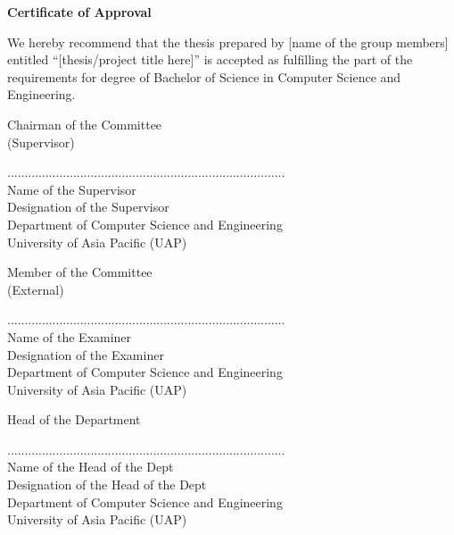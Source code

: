 \newpage
    \begin{center}
    
        \vspace*{0.1cm}
        \large
        
        
        \large
        \textbf{Certificate of Approval}\\
        \vspace{0.5cm}
        
    \end{center}
\noindent
{\large We hereby recommend that the thesis prepared by [name of the group members] entitled “[thesis/project title here]” is accepted as fulfilling the part of the requirements for degree of Bachelor of Science in Computer Science and Engineering.} 
\vspace{0.5cm}


\begin{flushright}
\vspace{1cm}
Chairman of the Committee
\\(Supervisor)
\end{flushright}
\vspace{-3cm}
................................................................................\\
Name of the Supervisor  
\\Designation of the Supervisor
\\Department of Computer Science and Engineering
\\University of Asia Pacific (UAP)

\vspace{0.5cm}
\begin{flushright}
\vspace{1cm}
Member of the Committee
\\(External)
\end{flushright}
\vspace{-3cm}
................................................................................\\
Name of the Examiner  
\\Designation of the Examiner
\\Department of Computer Science and Engineering
\\University of Asia Pacific (UAP)

\vspace{1cm}
\begin{flushright}
Head of the Department
\end{flushright}
\vspace{-2.5cm}
................................................................................\\
Name of the Head of the Dept  
\\Designation of the Head of the Dept
\\Department of Computer Science and Engineering
\\University of Asia Pacific (UAP)
